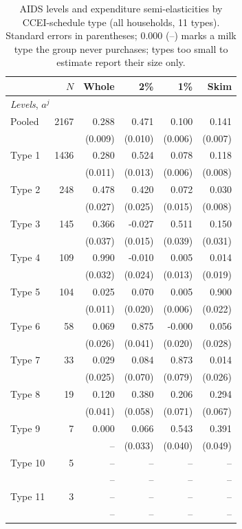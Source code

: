 \begin{table}[htbp]
\centering
\caption{AIDS levels and expenditure semi-elasticities by CCEI-schedule
type (all households, 11 types). Standard errors in parentheses;
0.000 (--) marks a milk type the group never purchases; types too small
to estimate report their size only.}
\label{tab:aids_types_ccei_all}
\begin{tabular}{lrrrrr}
\toprule
 & $N$ & Whole & 2\% & 1\% & Skim \\
\midrule
\multicolumn{6}{l}{\textit{Levels}, $a^j$} \\
Pooled & 2167 & 0.288 & 0.471 & 0.100 & 0.141 \\
 & & (0.009) & (0.010) & (0.006) & (0.007) \\
\addlinespace
Type 1 & 1436 & 0.280 & 0.524 & 0.078 & 0.118 \\
 & & (0.011) & (0.013) & (0.006) & (0.008) \\
Type 2 & 248 & 0.478 & 0.420 & 0.072 & 0.030 \\
 & & (0.027) & (0.025) & (0.015) & (0.008) \\
Type 3 & 145 & 0.366 & -0.027 & 0.511 & 0.150 \\
 & & (0.037) & (0.015) & (0.039) & (0.031) \\
Type 4 & 109 & 0.990 & -0.010 & 0.005 & 0.014 \\
 & & (0.032) & (0.024) & (0.013) & (0.019) \\
Type 5 & 104 & 0.025 & 0.070 & 0.005 & 0.900 \\
 & & (0.011) & (0.020) & (0.006) & (0.022) \\
Type 6 & 58 & 0.069 & 0.875 & -0.000 & 0.056 \\
 & & (0.026) & (0.041) & (0.020) & (0.028) \\
Type 7 & 33 & 0.029 & 0.084 & 0.873 & 0.014 \\
 & & (0.025) & (0.070) & (0.079) & (0.026) \\
Type 8 & 19 & 0.120 & 0.380 & 0.206 & 0.294 \\
 & & (0.041) & (0.058) & (0.071) & (0.067) \\
Type 9 & 7 & 0.000 & 0.066 & 0.543 & 0.391 \\
 & & -- & (0.033) & (0.040) & (0.049) \\
Type 10 & 5 & -- & -- & -- & -- \\
 & & -- & -- & -- & -- \\
Type 11 & 3 & -- & -- & -- & -- \\
 & & -- & -- & -- & -- \\

\end{tabular}
\end{table}
